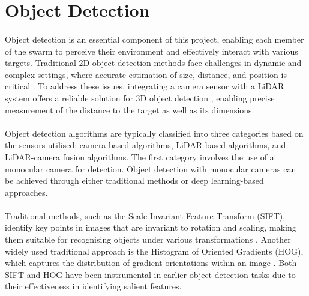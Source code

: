 \section{Object Detection}

\paragraph*{} 
Object detection is an essential component of this project, enabling each member of the swarm to perceive their environment and effectively interact with various targets. Traditional 2D object detection methods face challenges in dynamic and complex settings, where accurate estimation of size, distance, and position is critical \cite{hybridframework2023}. To address these issues, integrating a camera sensor with a LiDAR system offers a reliable solution for 3D object detection \cite{janai2020}, enabling precise measurement of the distance to the target as well as its dimensions.

\paragraph*{} 
Object detection algorithms are typically classified into three categories based on the sensors utilised: camera-based algorithms, LiDAR-based algorithms, and LiDAR-camera fusion algorithms. The first category involves the use of a monocular camera for detection. Object detection with monocular cameras can be achieved through either traditional methods or deep learning-based approaches.

\paragraph*{} 
Traditional methods, such as the Scale-Invariant Feature Transform (SIFT), identify key points in images that are invariant to rotation and scaling, making them suitable for recognising objects under various transformations \cite{lowe2004distinctive}. Another widely used traditional approach is the Histogram of Oriented Gradients (HOG), which captures the distribution of gradient orientations within an image \cite{dalal2005histograms}. Both SIFT and HOG have been instrumental in earlier object detection tasks due to their effectiveness in identifying salient features.

